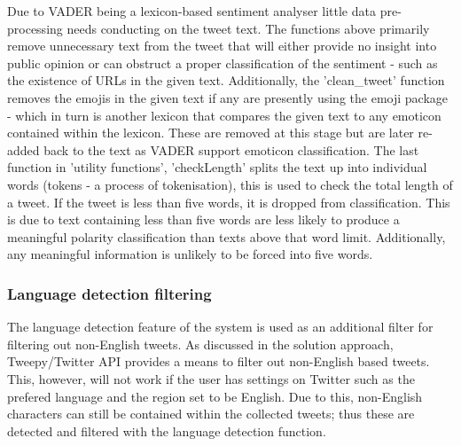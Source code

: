 \documentclass[oneside, 12pt]{article}
\begin{document}
		    Due to VADER being a lexicon-based sentiment analyser little data pre-processing needs conducting on the tweet text. The functions above primarily remove unnecessary text from the tweet that will either provide no insight into public opinion or can obstruct a proper classification of the sentiment - such as the existence of URLs in the given text. Additionally, the 'clean\_tweet' function removes the emojis in the given text if any are presently using the emoji package - which in turn is another lexicon that compares the given text to any emoticon contained within the lexicon. These are removed at this stage but are later re-added back to the text as VADER support emoticon classification. 
		    The last function in 'utility functions', 'checkLength' splits the text up into individual words (tokens - a process of tokenisation), this is used to check the total length of a tweet. If the tweet is less than five words, it is dropped from classification. This is due to text containing less than five words are less likely to produce a meaningful polarity classification than texts above that word limit. Additionally, any meaningful information is unlikely to be forced into five words.
			
			\subsubsection{Language detection filtering}
			
			The language detection feature of the system is used as an additional filter for filtering out non-English tweets. As discussed in the solution approach, Tweepy/Twitter API provides a means to filter out non-English based tweets. This, however, will not work if the user has settings on Twitter such as the prefered language and the region set to be English. Due to this, non-English characters can still be contained within the collected tweets; thus these are detected and filtered with the language detection function.
			
\end{document}
